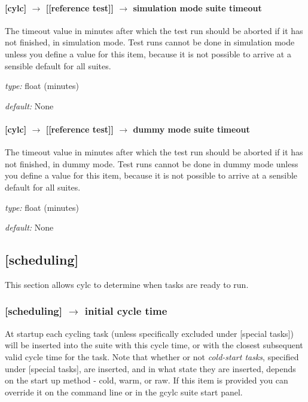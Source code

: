 \paragraph[simulation mode suite timeout]{[cylc] $\rightarrow$ [[reference test]] $\rightarrow$ simulation mode suite timeout}

The timeout value in minutes after which the test run should be aborted
if it has not finished, in simulation mode. Test runs cannot be done in
simulation mode unless you define a value for this item, because it is
not possible to arrive at a sensible default for all suites.

\begin{myitemize}
    \item {\em type:} float (minutes)
    \item {\em default:} None
\end{myitemize}

\paragraph[dummy mode suite timeout]{[cylc] $\rightarrow$ [[reference test]] $\rightarrow$ dummy mode suite timeout}

The timeout value in minutes after which the test run should be aborted
if it has not finished, in dummy mode.  Test runs cannot be done in
dummy mode unless you define a value for this item, because it is not
possible to arrive at a sensible default for all suites.

\begin{myitemize}
    \item {\em type:} float (minutes)
    \item {\em default:} None
\end{myitemize}


\subsection{[scheduling]}

This section allows cylc to determine when tasks are ready to run.

\subsubsection[initial cycle time]{[scheduling] $\rightarrow$ initial cycle time}

At startup each cycling task (unless specifically excluded under
[special tasks]) will be inserted into the suite with this cycle time,
or with the closest subsequent valid cycle time for the task. Note that
whether or not {\em cold-start tasks}, specified under [special tasks],
are inserted, and in what state they are inserted, depends on the start
up method - cold, warm, or raw.  If this item is provided you can 
override it on the command line or in the gcylc suite start panel.

